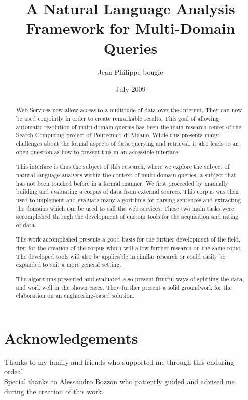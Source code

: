 \documentclass[a4paper]{report}
\begin{document}
\onehalfspacing

\title{A Natural Language Analysis Framework for Multi-Domain Queries}
\author{Jean-Philippe bougie}
\date{July 2009}



\tableofcontents
\listoffigures
\listoftables

\chapter*{Acknowledgements}
\begin{flushright}
  \begin{emph}
    Thanks to my family and friends who supported me through this enduring ordeal.\\[1cm]
    Special thanks to Alessandro Bozzon who patiently guided and advised me during the creation of this work.
  \end{emph}
\end{flushright}

\begin{abstract}
  Web Services now allow access to a multitude of data over the Internet. They can now be used conjointly in order to create remarkable results. This goal of allowing automatic resolution of multi-domain queries has been the main research center of the Search Computing project of Politecnico di Milano. While this presents many challenges about the formal aspects of data querying and retrieval, it also leads to an open question as how to present this in an accessible interface.
  
  This interface is thus the subject of this research, where we explore the subject of natural language analysis within the context of multi-domain queries, a subject that has not been touched before in a formal manner.
  We first proceeded by manually building and evaluating a corpus of data from external sources. This corpus was then used to implement and evaluate many algorithms for parsing sentences and extracting the domains which can be used to call the web services. These two main tasks were accomplished through the development of custom tools for the acquisition and rating of data.
  
  The work accomplished presents a good basis for the further development of the field, first for the creation of the corpus which will allow further research on the same topic. The developed tools will also be applicable in similar research or could easily be expanded to suit a more general setting.
  
  The algorithms presented and evaluated also present fruitful ways of splitting the data, and work well in the shown cases. They further present a solid groundwork for the elaboration on an engineering-based solution.
\end{abstract}

















\end{document}
